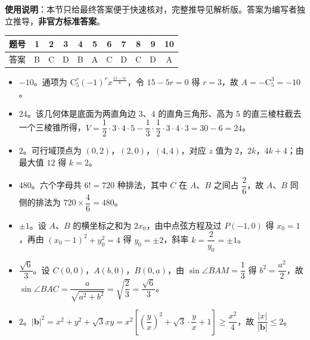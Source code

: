 
\begin{gknotice}
\textbf{使用说明}：本节只给最终答案便于快速核对，完整推导见解析版。答案为编写者独立推导，\textbf{非官方标准答案}。
\end{gknotice}

\begin{center}\begin{tabular}{ccccccccccc}
\toprule
题号 & 1 & 2 & 3 & 4 & 5 & 6 & 7 & 8 & 9 & 10 \\
\midrule
答案 & B & C & D & B & A & C & D & C & D & A \\
\bottomrule
\end{tabular}\end{center}

\begin{itemize}[leftmargin=2.6em]
  \item[\textbf{11.}] $-10$。通项为 $\mathrm C_5^r(-1)^rx^{\frac{15-5r}6}$，令 $15-5r=0$ 得 $r=3$，故 $A=-\mathrm C_5^3=-10$。
  \item[\textbf{12.}] $24$。该几何体是底面为两直角边 $3$、$4$ 的直角三角形、高为 $5$ 的直三棱柱截去一个三棱锥所得，$V=\dfrac12\cdot3\cdot4\cdot5-\dfrac13\cdot\dfrac12\cdot3\cdot4\cdot3=30-6=24$。
  \item[\textbf{13.}] $2$。可行域顶点为 $(0,2)$，$(2,0)$，$(4,4)$，对应 $z$ 值为 $2$，$2k$，$4k+4$；由最大值 $12$ 得 $k=2$。
  \item[\textbf{14.}] $480$。六个字母共 $6!=720$ 种排法，其中 $C$ 在 $A$、$B$ 之间占 $\dfrac26$，故 $A$、$B$ 同侧的排法为 $720\times\dfrac46=480$。
  \item[\textbf{15.}] $\pm1$。设 $A$、$B$ 的横坐标之和为 $2x_0$，由中点弦方程及过 $P(-1,0)$ 得 $x_0=1$，再由 $(x_0-1)^2+y_0^2=4$ 得 $y_0=\pm2$，斜率 $k=\dfrac2{y_0}=\pm1$。
  \item[\textbf{16.}] $\dfrac{\sqrt6}3$。设 $C(0,0)$，$A(b,0)$，$B(0,a)$，由 $\sin\angle BAM=\dfrac13$ 得 $b^2=\dfrac{a^2}2$，故 $\sin\angle BAC=\dfrac{a}{\sqrt{a^2+b^2}}=\sqrt{\dfrac23}=\dfrac{\sqrt6}3$。
  \item[\textbf{17.}] $2$。$|\boldsymbol b|^2=x^2+y^2+\sqrt3xy=x^2\left[\left(\dfrac yx\right)^2+\sqrt3\cdot\dfrac yx+1\right]\geqslant\dfrac{x^2}4$，故 $\dfrac{|x|}{|\boldsymbol b|}\leqslant2$。
\end{itemize}

